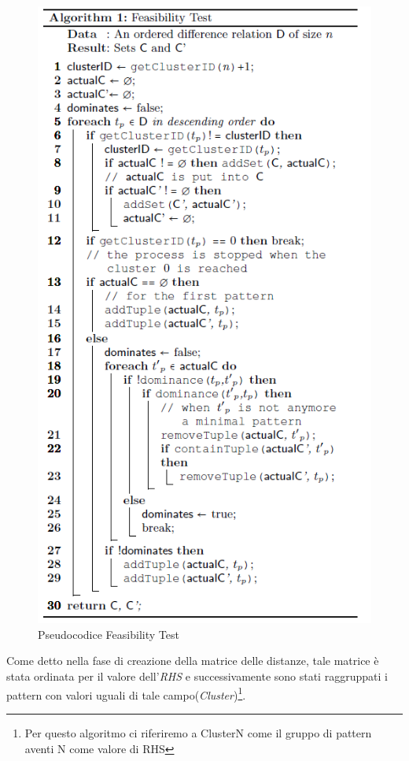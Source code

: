 \begin{figure}[H]
	\centering
	\includegraphics[scale = 0.7]{Immagini/Feasibility.png}
	\caption{Pseudocodice Feasibility Test}
	\label{fig:Pseudocodice Feasibility Test}
\end{figure}
Come detto nella fase di creazione della matrice delle distanze, tale matrice è stata ordinata per il valore dell'\emph{RHS} e successivamente sono stati raggruppati i pattern con valori uguali di tale campo(\emph{Cluster})\footnote{Per questo algoritmo ci riferiremo a ClusterN come il gruppo di pattern aventi N come valore di RHS }.
